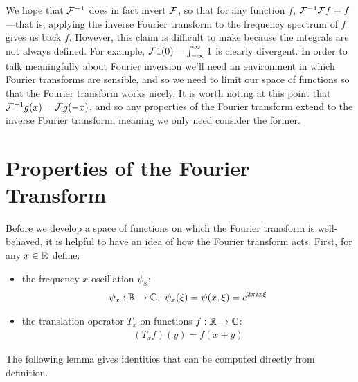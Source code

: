     We hope that $\mathcal{F}^{-1}$ does in fact invert $\mathcal{F}$, so that for any function $f$, $\mathcal{F}^{-1}\mathcal{F} f = f$---that is, applying the inverse Fourier transform to the frequency spectrum of $f$ gives us back $f$.
    However, this claim is difficult to make because the integrals are not always defined.
    For example, $\mathcal{F}1(0)=\int_{-\infty}^\infty1$ is clearly divergent.
    In order to talk meaningfully about Fourier inversion we'll need an environment in which Fourier transforms are sensible, and so we need to limit our space of functions so that the Fourier transform works nicely.
    It is worth noting at this point that $\mathcal{F}^{-1}g(x) = \mathcal{F} g(-x)$, and so any properties of the Fourier transform extend to the inverse Fourier transform, meaning we only need consider the former.

    \section{Properties of the Fourier Transform}
      Before we develop a space of functions on which the Fourier transform is well-behaved, it is helpful to have an idea of how the Fourier transform acts.
      First, for any $x\in\mathbb{R}$ define:
      \begin{itemize}
        \item the frequency-$x$ oscillation $\psi_x$:
          \begin{align*}
            \psi_x:\mathbb{R}\rightarrow\mathbb{C},\ \psi_x(\xi) = \psi(x,\xi) = e^{2\pi i x \xi}
          \end{align*}
        \item the translation operator $T_x$ on functions $f:\mathbb{R}\rightarrow\mathbb{C}$:
          \begin{align*}
            (T_xf)(y) = f(x+y)
          \end{align*}
      \end{itemize}
      The following lemma gives identities that can be computed directly from definition.
